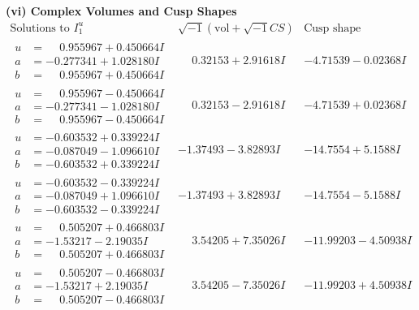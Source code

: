 \documentclass[1p]{elsarticle_modified}
\theoremstyle{definition}
\newcommand{\I}{\sqrt{-1}}
\begin{document}
\newpage\flushleft \textbf{(vi) Complex Volumes and Cusp Shapes}
$$\begin{array}{c|c|c}  
\text{Solutions to }I^u_{1}& \I (\text{vol} + \sqrt{-1}CS) & \text{Cusp shape}\\
 \hline 
\begin{aligned}
u &= \phantom{-}0.955967 + 0.450664 I \\
a &= -0.277341 + 1.028180 I \\
b &= \phantom{-}0.955967 + 0.450664 I\end{aligned}
 & \phantom{-}0.32153 + 2.91618 I & -4.71539 - 0.02368 I \\ \hline\begin{aligned}
u &= \phantom{-}0.955967 - 0.450664 I \\
a &= -0.277341 - 1.028180 I \\
b &= \phantom{-}0.955967 - 0.450664 I\end{aligned}
 & \phantom{-}0.32153 - 2.91618 I & -4.71539 + 0.02368 I \\ \hline\begin{aligned}
u &= -0.603532 + 0.339224 I \\
a &= -0.087049 - 1.096610 I \\
b &= -0.603532 + 0.339224 I\end{aligned}
 & -1.37493 - 3.82893 I & -14.7554 + 5.1588 I \\ \hline\begin{aligned}
u &= -0.603532 - 0.339224 I \\
a &= -0.087049 + 1.096610 I \\
b &= -0.603532 - 0.339224 I\end{aligned}
 & -1.37493 + 3.82893 I & -14.7554 - 5.1588 I \\ \hline\begin{aligned}
u &= \phantom{-}0.505207 + 0.466803 I \\
a &= -1.53217 - 2.19035 I \\
b &= \phantom{-}0.505207 + 0.466803 I\end{aligned}
 & \phantom{-}3.54205 + 7.35026 I & -11.99203 - 4.50938 I \\ \hline\begin{aligned}
u &= \phantom{-}0.505207 - 0.466803 I \\
a &= -1.53217 + 2.19035 I \\
b &= \phantom{-}0.505207 - 0.466803 I\end{aligned}
 & \phantom{-}3.54205 - 7.35026 I & -11.99203 + 4.50938 I \\ \hline\begin{aligned}

\end{aligned}
\end{array}$$
\end{document}
